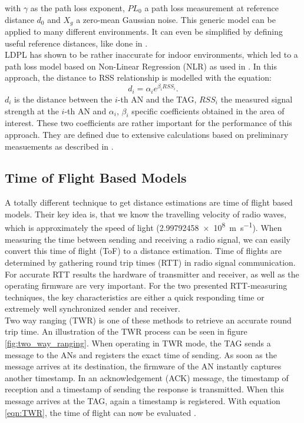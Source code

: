 with $\gamma$ as the path loss exponent, $PL_{0}$ a path loss measurement at reference distance $d_0$ and $X_{g}$ a zero-mean Gaussian noise. This generic model can be applied to many different environments. It can even be simplified by defining useful reference distances, like done in \cite{Kurt}.\\
\noindent\hspace*{5mm}%
LDPL has shown to be rather inaccurate for indoor environments, which led to a path loss model based on Non-Linear Regression (NLR) as used in \cite{ZanLi}. In this approach, the distance to RSS relationship is modelled with the equation:
\begin{equation}
d_{i} = \alpha_{i} e^{\beta_{i}RSS_{i}}.
\label{eqn:NLR}
\end{equation}
$d_{i}$ is the distance between the $i$-th AN and the TAG, $RSS_{i}$ the measured signal strength at the $i$-th AN and $\alpha_{i}$, $\beta_{i}$ specific coefficients obtained in the area of interest. These two coefficients are rather important for the performance of this approach. They are defined due to extensive calculations based on preliminary measuements as described in \cite{Kurt}.


\subsection{Time of Flight Based Models}
A totally different technique to get distance estimations are time of flight based models. Their key idea is, that we know the travelling velocity of radio waves, which is approximately the speed of light (\SI{2.99792458e8}{\meter\per\second}). When measuring the time between sending and receiving a radio signal, we can easily convert this time of flight (ToF) to a distance estimation. Time of flights are determined by gathering round trip times (RTT) in radio signal communication. For accurate RTT results the hardware of transmitter and receiver, as well as the operating firmware are very important. For the two presented RTT-measuring techniques, the key characteristics are either a quick responding time or extremely well synchronized sender and receiver.\\
\noindent\hspace*{5mm}%
Two way ranging (TWR) is one of these methods to retrieve an accurate round trip time. An illustration of the TWR process can be seen in figure \ref{fig:two_way_ranging}. When operating in TWR mode, the TAG sends a message to the ANs and registers the exact time of sending. As soon as the message arrives at its destination, the firmware of the AN instantly captures another timestamp. In an acknowledgement (ACK) message, the timestamp of reception and a timestamp of sending the response is transmitted. When this message arrives at the TAG, again a timestamp is registered. With equation \ref{eqn:TWR}, the time of flight can now be evaluated \cite{SewioTWR}.

